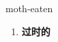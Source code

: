 
\begin{frame}
{\huge moth-eaten}
\begin{center}
\begin{enumerate}\Large
  \item \textbf{过时的}
\end{enumerate}
\end{center}
\end{frame}
